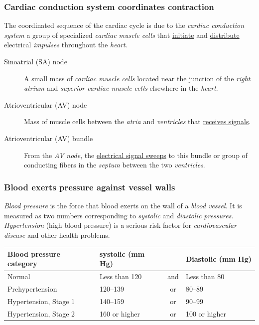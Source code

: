 \documentclass[11pt]{article}
\begin{document}
\subsubsection{Cardiac conduction system coordinates contraction}
\label{sec:org6773634}
The coordinated sequence of the cardiac cycle is due to the \emph{cardiac
conduction system} a group of specialized \emph{cardiac muscle cells} that \uline{initiate}
and \uline{distribute} electrical \emph{impulses} throughout the \emph{heart}.

\begin{description}
\item[{Sinoatrial (SA) node}] A small mass of \emph{cardiac muscle cells} located \uline{near}
the \uline{junction} of the \emph{right atrium} and \emph{superior cardiac muscle cells}
elsewhere in the \emph{heart}.
\item[{Atrioventricular (AV) node}] Mass of muscle cells between the \emph{atria} and
\emph{ventricles} that \uline{receives signals}.
\item[{Atrioventricular (AV) bundle}] From the \emph{AV node}, the \uline{electrical signal
sweeps} to this bundle or group of conducting fibers in the \emph{septum}
between the two \emph{ventricles}.
\end{description}

\subsubsection{Blood exerts pressure against vessel walls}
\label{sec:org4ce27ba}
\emph{Blood pressure} is the force that blood exerts on the wall of a \emph{blood vessel}.
It is measured as two numbers corresponding to \emph{systolic} and \emph{diastolic
pressures}. \emph{Hypertension} (high blood pressure) is a serious risk factor for
\emph{cardiovascular disease} and other health problems.

\begin{center}
\begin{tabular}{llcl}
\textbf{Blood pressure category} & \textbf{systolic} (mm Hg) &  & \textbf{Diastolic} (mm Hg)\\
\hline
Normal & Less than 120 & and & Less than 80\\
Prehypertension & 120--139 & or & 80--89\\
Hypertension, Stage 1 & 140--159 & or & 90--99\\
Hypertension, Stage 2 & 160 or higher & or & 100 or higher\\
\end{tabular}
\end{center}
\end{document}
